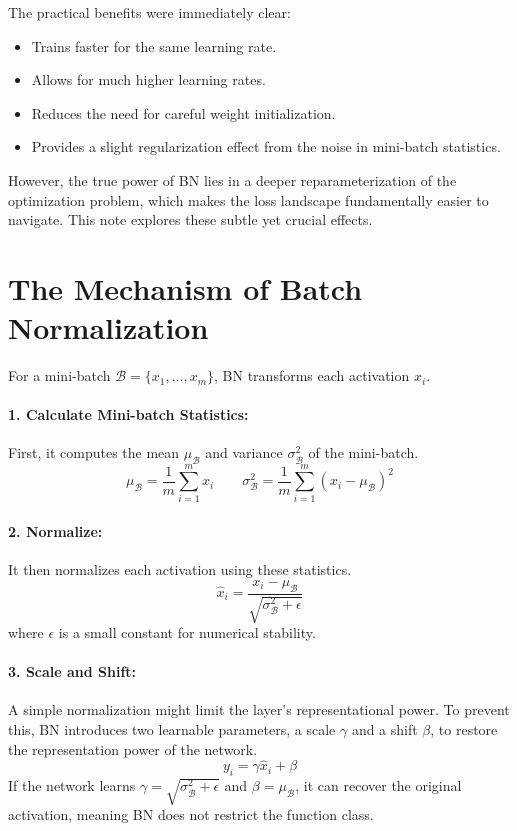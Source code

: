 \documentclass{article}
\begin{document}
The practical benefits were immediately clear:
\begin{itemize}
    \item Trains faster for the same learning rate.
    \item Allows for much higher learning rates.
    \item Reduces the need for careful weight initialization.
    \item Provides a slight regularization effect from the noise in mini-batch statistics.
\end{itemize}

However, the true power of BN lies in a deeper reparameterization of the optimization problem, which makes the loss landscape fundamentally easier to navigate. This note explores these subtle yet crucial effects.

\section{The Mechanism of Batch Normalization}
For a mini-batch $\mathcal{B} = \{x_1, \dots, x_m\}$, BN transforms each activation $x_i$.

\paragraph{1. Calculate Mini-batch Statistics:} First, it computes the mean $\mu_{\mathcal{B}}$ and variance $\sigma_{\mathcal{B}}^2$ of the mini-batch.
$$ \mu_{\mathcal{B}} = \frac{1}{m} \sum_{i=1}^{m} x_i \quad \quad \sigma_{\mathcal{B}}^2 = \frac{1}{m} \sum_{i=1}^{m} (x_i - \mu_{\mathcal{B}})^2 $$

\paragraph{2. Normalize:} It then normalizes each activation using these statistics.
$$ \hat{x}_i = \frac{x_i - \mu_{\mathcal{B}}}{\sqrt{\sigma_{\mathcal{B}}^2 + \epsilon}} $$
where $\epsilon$ is a small constant for numerical stability.

\paragraph{3. Scale and Shift:} A simple normalization might limit the layer's representational power. To prevent this, BN introduces two learnable parameters, a scale $\gamma$ and a shift $\beta$, to restore the representation power of the network.
$$ y_i = \gamma \hat{x}_i + \beta $$
If the network learns $\gamma = \sqrt{\sigma_{\mathcal{B}}^2 + \epsilon}$ and $\beta = \mu_{\mathcal{B}}$, it can recover the original activation, meaning BN does not restrict the function class.
\end{document}
